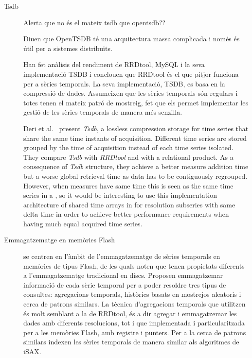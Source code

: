 \begin{description}
\item[Tsdb]
Alerta que no és el mateix tsdb que opentsdb??


Diuen que OpenTSDB té una arquitectura massa complicada i només és útil per a sistemes distribuïts.

Han fet anàlisis del rendiment de RRDtool, MySQL i la seva implementació TSDB i conclouen que RRDtool és el que pitjor funciona per a sèries temporals. La seva implementació, TSDB, es basa en la compressió de dades. Assumeixen que les sèries temporals són regulars i totes tenen el mateix patró de mostreig, fet que els permet implementar les gestió de les sèries temporals de manera més senzilla.

Deri et al.\ \cite{deri12:tsdb_compressed_database} present
\emph{Tsdb}, a lossless compression storage  for time
series that share the same time instants of acquisition. Different
time series are stored grouped by the time of acquisition instead of
each time series isolated.  They compare \emph{Tsdb} with \emph{RRDtool} and
with a relational product. As a consequence of \emph{Tsdb} structure,
they achieve a better measure addition time but a worse global
retrieval time as data has to be contiguously regrouped. However, when
measures have same time this is seen as the same time series in a
, so it would be interesting to use this implementation
architecture of shared time arrays in  for resolution subseries
with same delta time in order to achieve better performance requirements
when having much equal acquired time series.





\item[Emmagatzematge en memòries Flash]
  \textcite{dou14:historic_queries_flash_storage} se centren en
  l'àmbit de l'emmagatzematge de sèries temporals en memòries de tipus
  Flash, de les quals noten que tenen propietats diferents a
  l'emmagatzematge tradicional en discs.  Proposen emmagatzemar
  informació de cada sèrie temporal per a poder resoldre tres tipus de
  consultes: agregacions temporals, històrics basats en mostrejos
  aleatoris i cerca de patrons similars.  La tècnica d'agregacions
  temporals que utilitzen és molt semblant a la de RRDtool, és a dir
  agregar i emmagatzemar les dades amb diferents resolucions, tot i
  que implementada i particularitzada per a les memòries Flash, amb
  registre i punters. Per a la cerca de patrons similars indexen les
  sèries temporals de manera similar als algoritmes de iSAX.


\end{description}



